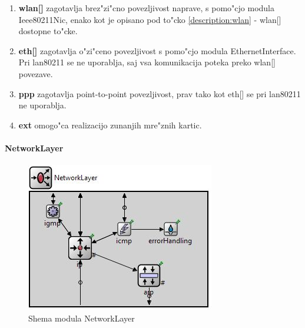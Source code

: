 \documentclass[a4paper,11pt]{article}
\begin{document}
\begin{enumerate}
    \item \textbf{wlan[]} zagotavlja brez"zi"cno povezljivost naprave, s pomo"cjo modula Ieee80211Nic, enako kot je opisano pod to"cko \ref{description:wlan} - wlan[] dostopne to"cke.


    \item \textbf{eth[]} zagotavlja o"zi"ceno povezljivost s pomo"cjo modula EthernetInterface. Pri lan80211 se ne uporablja, saj vsa komunikacija poteka preko wlan[] povezave.

    \item \textbf{ppp} zagotavlja point-to-point povezljivost, prav tako kot eth[] se pri lan80211 ne uporablja.

    \item \textbf{ext} omogo"ca realizacijo zunanjih mre"znih kartic.

\end{enumerate}


\paragraph{NetworkLayer}
\label{description:networklayer}


\begin{figure}[htbp]
    \begin{center}
        \includegraphics[scale=0.8]{img/network.jpg}
        \caption{Shema modula NetworkLayer}
	\label{image:wirelesshost}
    \end{center}
\end{figure}
\end{document}
